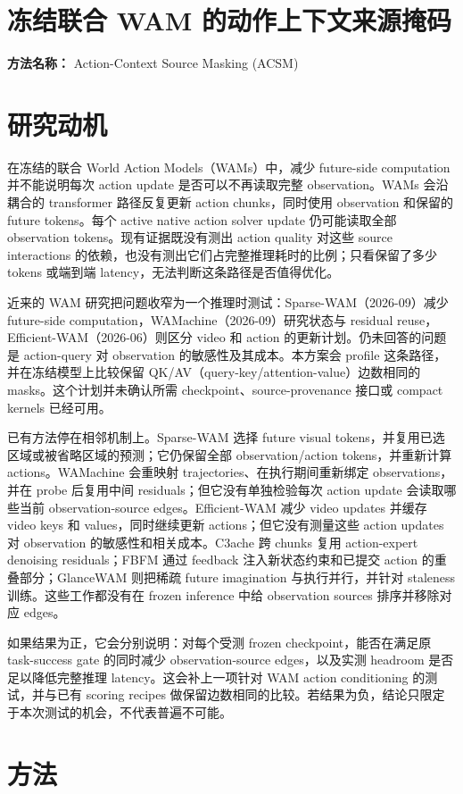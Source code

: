 \documentclass[10pt,a4paper]{article}
\begin{document}
\section*{冻结联合 WAM 的动作上下文来源掩码}
\textbf{方法名称：} Action-Context Source Masking (ACSM)
\section*{研究动机}
在冻结的联合 World Action Models（WAMs）中，减少 future-side computation 并不能说明每次 action update 是否可以不再读取完整 observation。WAMs 会沿耦合的 transformer 路径反复更新 action chunks，同时使用 observation 和保留的 future tokens。每个 active native action solver update 仍可能读取全部 observation tokens。现有证据既没有测出 action quality 对这些 source interactions 的依赖，也没有测出它们占完整推理耗时的比例；只看保留了多少 tokens 或端到端 latency，无法判断这条路径是否值得优化。

近来的 WAM 研究把问题收窄为一个推理时测试：Sparse-WAM（2026-09）减少 future-side computation，WAMachine（2026-09）研究状态与 residual reuse，Efficient-WAM（2026-06）则区分 video 和 action 的更新计划。仍未回答的问题是 action-query 对 observation 的敏感性及其成本。本方案会 profile 这条路径，并在冻结模型上比较保留 QK/AV（query-key/attention-value）边数相同的 masks。这个计划并未确认所需 checkpoint、source-provenance 接口或 compact kernels 已经可用。

已有方法停在相邻机制上。Sparse-WAM 选择 future visual tokens，并复用已选区域或被省略区域的预测；它仍保留全部 observation/action tokens，并重新计算 actions。WAMachine 会重映射 trajectories、在执行期间重新绑定 observations，并在 probe 后复用中间 residuals；但它没有单独检验每次 action update 会读取哪些当前 observation-source edges。Efficient-WAM 减少 video updates 并缓存 video keys 和 values，同时继续更新 actions；但它没有测量这些 action updates 对 observation 的敏感性和相关成本。C3ache 跨 chunks 复用 action-expert denoising residuals；FBFM 通过 feedback 注入新状态约束和已提交 action 的重叠部分；GlanceWAM 则把稀疏 future imagination 与执行并行，并针对 staleness 训练。这些工作都没有在 frozen inference 中给 observation sources 排序并移除对应 edges。

如果结果为正，它会分别说明：对每个受测 frozen checkpoint，能否在满足原 task-success gate 的同时减少 observation-source edges，以及实测 headroom 是否足以降低完整推理 latency。这会补上一项针对 WAM action conditioning 的测试，并与已有 scoring recipes 做保留边数相同的比较。若结果为负，结论只限定于本次测试的机会，不代表普遍不可能。
\section*{方法}
\end{document}
